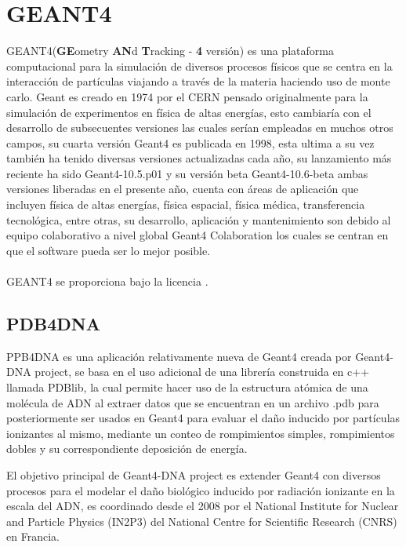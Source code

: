 
\clearpage

\section{GEANT4}
\label{sec:GEANT4}
GEANT4(\textbf{GE}ometry \textbf{AN}d \textbf{T}racking - \textbf{4} versión) es una plataforma computacional para la simulación de diversos procesos físicos que se centra en la interacción de partículas viajando a través de la materia haciendo uso de monte carlo. Geant es creado en 1974 por el CERN pensado originalmente para la simulación de experimentos en física de altas energías, esto cambiaría con el desarrollo de subsecuentes versiones las cuales serían empleadas en muchos otros campos, su cuarta versión Geant4 es publicada en 1998, esta ultima a su vez también ha tenido diversas versiones actualizadas cada año, su lanzamiento más reciente ha sido Geant4-10.5.p01 y su versión beta Geant4-10.6-beta ambas versiones liberadas en el presente año,  cuenta  con áreas de aplicación que incluyen física de altas energías, física espacial, física médica, transferencia tecnológica, entre otras, su desarrollo, aplicación y mantenimiento son debido al equipo colaborativo a nivel global Geant4 Colaboration los cuales se centran en que el software pueda ser lo mejor posible.
\\
\\
GEANT4 se proporciona bajo la licencia \href{https://geant4.web.cern.ch/license/LICENSE.html}{\color{blue}{Geant4 Software License}}.

\subsection{PDB4DNA}

PPB4DNA es una aplicación relativamente nueva de Geant4 creada por Geant4-DNA project, se basa en el uso adicional de una librería construida en c++ llamada PDBlib, la cual permite hacer uso de la estructura atómica de una molécula de ADN al extraer datos que se encuentran en un archivo .pdb para posteriormente ser usados en Geant4 para evaluar el daño inducido por partículas ionizantes al mismo, mediante un conteo de rompimientos simples, rompimientos dobles y su correspondiente deposición de energía.

El objetivo principal de Geant4-DNA project  es extender Geant4 con diversos procesos para el modelar el daño biológico inducido por radiación ionizante en la escala del ADN, es coordinado desde el 2008 por el National Institute for Nuclear and Particle Physics (IN2P3) del National Centre for Scientific Research (CNRS) en Francia.


